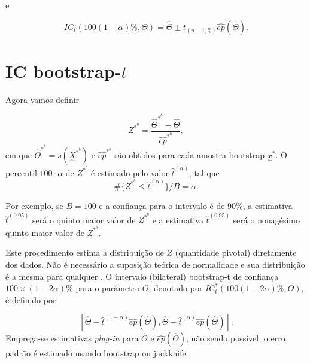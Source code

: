 \documentclass[
  letterpaper,
  DIV=11,
  numbers=noendperiod]{scrreprt}
\begin{document}
e

\[IC_t\left(100(1-\alpha)\%,\Theta\right)=\hat{\Theta} \pm t_{(n-1,\frac{\alpha}{2})}\hat{ep}(\hat{\Theta}).\]

\section{\texorpdfstring{IC
bootstrap-\(t\)}{IC bootstrap-t}}\label{ic-bootstrap-t}

Agora vamos definir

\[Z^{*^b}=\dfrac{ \hat{\Theta}^{*^b} - \hat{\Theta} }{\hat{ep}^{*^b}},\]
em que \(\hat{\Theta}^{*^b}=s(\underset{\sim}{X}^{*^b})\) e
\(\hat{ep}^{*^b}\) são obtidos para cada amostra bootstrap
\(\underset{\sim}{x}^*\). O percentil \(100 \cdot \alpha\) de
\(Z^{*^b}\) é estimado pelo valor \(\hat{t}^{(\alpha)}\), tal que
\[ \#\{Z^{*^b}\leq \hat{t}^{(\alpha)} \}/B=\alpha.\]

Por exemplo, se \(B=100\) e a confiança para o intervalo é de 90\(\%\),
a estimativa \(\hat{t}^{(0.05)}\) será o quinto maior valor de
\(Z^{*^b}\) e a estimativa \(\hat{t}^{(0.95)}\) será o nonagésimo quinto
maior valor de \(Z^{*^b}\).

Este procedimento estima a distribuição de \(Z\) (quantidade pivotal)
diretamente dos dados. Não é necessário a suposição teórica de
normalidade e sua distribuição é a mesma para qualquer \theta. O
intervalo (bilateral) bootstrap-t de confiança
\(100\times(1-2\alpha)\%\) para o parâmetro \(\Theta\), denotado por
\(IC_t^*\left(100(1-2\alpha)\%,\Theta\right)\), é definido por:

\[ \left[\hat{\Theta} - \hat{t}^{(1-\alpha)}\hat{ep}(\hat{\Theta}), \hat{\Theta} - \hat{t}^{(\alpha)}\hat{ep}(\hat{\Theta})\right].\]
Emprega-se estimativas \textit{plug-in} para \(\hat{\Theta}\) e
\(\hat{ep}(\hat{\Theta})\); não sendo possível, o erro padrão é estimado
usando bootstrap ou jackknife.
\end{document}
